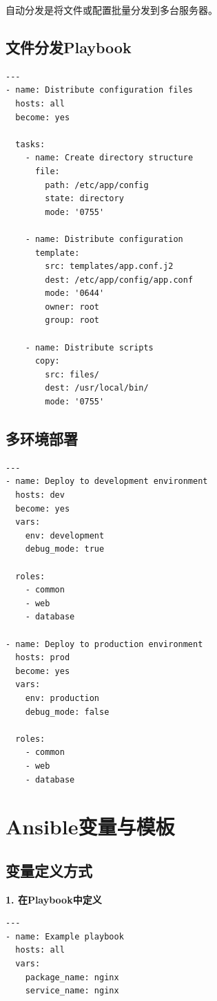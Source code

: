 \documentclass[12pt,UTF8]{ctexbook}
\begin{document}
自动分发是将文件或配置批量分发到多台服务器。

\subsection*{文件分发Playbook}
\begin{lstlisting}
---
- name: Distribute configuration files
  hosts: all
  become: yes
  
  tasks:
    - name: Create directory structure
      file:
        path: /etc/app/config
        state: directory
        mode: '0755'
    
    - name: Distribute configuration
      template:
        src: templates/app.conf.j2
        dest: /etc/app/config/app.conf
        mode: '0644'
        owner: root
        group: root
    
    - name: Distribute scripts
      copy:
        src: files/
        dest: /usr/local/bin/
        mode: '0755'
\end{lstlisting}

\subsection*{多环境部署}
\begin{lstlisting}
---
- name: Deploy to development environment
  hosts: dev
  become: yes
  vars:
    env: development
    debug_mode: true
  
  roles:
    - common
    - web
    - database

- name: Deploy to production environment
  hosts: prod
  become: yes
  vars:
    env: production
    debug_mode: false
  
  roles:
    - common
    - web
    - database
\end{lstlisting}

\section{Ansible变量与模板}
\label{sec:ansible-variables}

\subsection*{变量定义方式}

\textbf{1. 在Playbook中定义}
\begin{lstlisting}
---
- name: Example playbook
  hosts: all
  vars:
    package_name: nginx
    service_name: nginx
\end{lstlisting}
\end{document}
